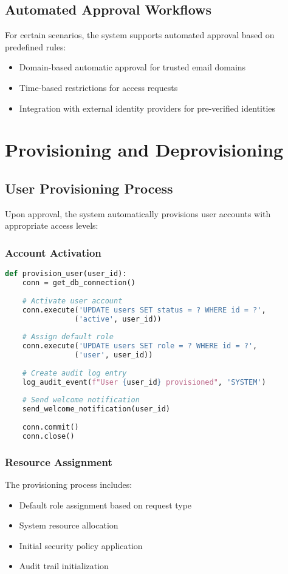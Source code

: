 \documentclass[12pt,a4paper]{article}
\begin{document}
\subsection{Automated Approval Workflows}
For certain scenarios, the system supports automated approval based on predefined rules:

\begin{itemize}
    \item Domain-based automatic approval for trusted email domains
    \item Time-based restrictions for access requests
    \item Integration with external identity providers for pre-verified identities
\end{itemize}

\section{Provisioning and Deprovisioning}

\subsection{User Provisioning Process}
Upon approval, the system automatically provisions user accounts with appropriate access levels:

\subsubsection{Account Activation}
\begin{lstlisting}[language=Python, caption=User Provisioning Implementation]
def provision_user(user_id):
    conn = get_db_connection()
    
    # Activate user account
    conn.execute('UPDATE users SET status = ? WHERE id = ?', 
                ('active', user_id))
    
    # Assign default role
    conn.execute('UPDATE users SET role = ? WHERE id = ?', 
                ('user', user_id))
    
    # Create audit log entry
    log_audit_event(f"User {user_id} provisioned", 'SYSTEM')
    
    # Send welcome notification
    send_welcome_notification(user_id)
    
    conn.commit()
    conn.close()
\end{lstlisting}

\subsubsection{Resource Assignment}
The provisioning process includes:
\begin{itemize}
    \item Default role assignment based on request type
    \item System resource allocation
    \item Initial security policy application
    \item Audit trail initialization
\end{itemize}
\end{document}

